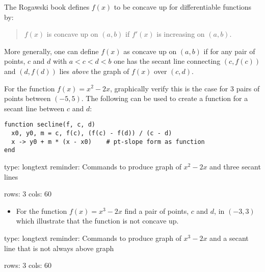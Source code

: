 \documentclass[12pt]{article}
\begin{document}
The Rogawski book defines $f(x)$ to be concave up for differentiable
functions by:

\begin{quote}
$f(x)$ is concave up on $(a,b)$ if $f'(x)$ is increasing on $(a,b)$.
\end{quote}

More generally, one can define $f(x)$ as concave up on $(a,b)$ if for
any pair of points, $c$ and $d$ with $a < c < d < b$ one has the secant
line connecting $(c,f(c))$ and $(d,f(d))$ lies \emph{above} the graph of
$f(x)$ over $(c,d)$.

For the function $f(x) = x^2 - 2x$, graphically verify this is the case
for 3 pairs of points between $(-5,5)$. The following can be used to
create a function for a secant line between $c$ and $d$:



\begin{verbatim}
function secline(f, c, d)
  x0, y0, m = c, f(c), (f(c) - f(d)) / (c - d)
  x -> y0 + m * (x - x0)    # pt-slope form as function
end
\end{verbatim}
\begin{answer}
type: longtext
reminder: Commands to produce graph of \( x^2 - 2x \) and three secant lines

rows: 3
cols: 60
\end{answer}

\begin{itemize}
\itemsep1pt\parskip0pt
\item
  For the function $f(x) = x^3 - 2x$ find a pair of points, $c$ and $d$,
  in $(-3,3)$ which illustrate that the function is not concave up.
\end{itemize}

\begin{answer}
type: longtext
reminder: Commands to produce graph of \( x^3 - 2x \) and a secant line that is not always above graph

rows: 3
cols: 60
\end{answer}
\end{document}
